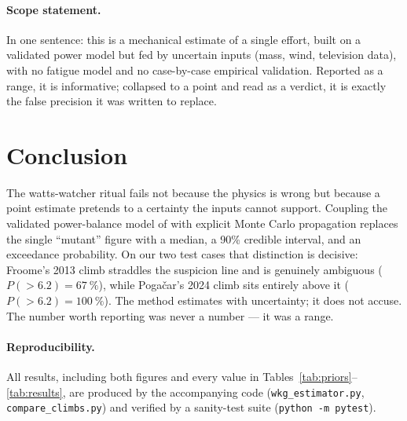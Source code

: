 \documentclass[11pt]{article}
\begin{document}
\paragraph{Scope statement.}
In one sentence: this is a mechanical estimate of a single effort, built on a
validated power model but fed by uncertain inputs (mass, wind, television data),
with no fatigue model and no case-by-case empirical validation. Reported as a
range, it is informative; collapsed to a point and read as a verdict, it is
exactly the false precision it was written to replace.

\section{Conclusion}

The watts-watcher ritual fails not because the physics is wrong but because a
point estimate pretends to a certainty the inputs cannot support. Coupling the
validated power-balance model of \citet{martin1998} with explicit Monte Carlo
propagation replaces the single ``mutant'' figure with a median, a 90\% credible
interval, and an exceedance probability. On our two test cases that distinction
is decisive: Froome's 2013 climb straddles the suspicion line and is genuinely
ambiguous ($P(>\!6.2)=\SI{67}{\percent}$), while Pogačar's 2024 climb sits
entirely above it ($P(>\!6.2)=\SI{100}{\percent}$). The method estimates with
uncertainty; it does not accuse. The number worth reporting was never a number
--- it was a range.

\paragraph{Reproducibility.}
All results, including both figures and every value in
Tables~\ref{tab:priors}--\ref{tab:results}, are produced by the accompanying
code (\texttt{wkg\_estimator.py}, \texttt{compare\_climbs.py}) and verified by a
sanity-test suite (\texttt{python -m pytest}).


\end{document}
